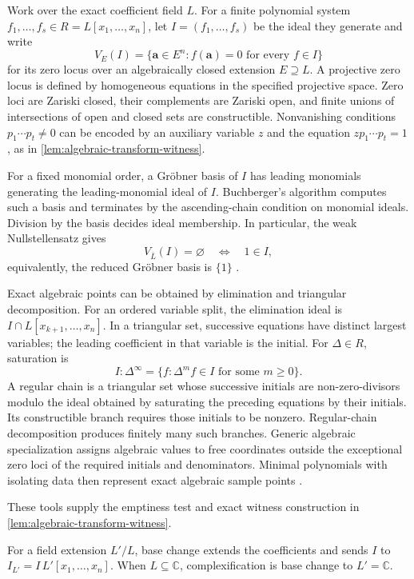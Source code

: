 \documentclass[11pt,letterpaper,onecolumn]{article}
\theoremstyle{plain}
\theoremstyle{definition}
\theoremstyle{remark}
\begin{document}
Work over the exact coefficient field \(L\). For a finite polynomial
system \(f_1,\ldots,f_s\in R=L[x_1,\ldots,x_n]\), let
\(I=(f_1,\ldots,f_s)\) be the ideal they generate and write
\[
 V_E(I)=\{\mathbf a\in E^n:f(\mathbf a)=0\text{ for every }f\in I\}
\]
for its zero locus over an algebraically closed extension \(E\supseteq L\).
A projective zero locus is defined by homogeneous equations in the
specified projective space. Zero loci are Zariski closed, their complements
are Zariski open, and finite unions of intersections of open and closed
sets are constructible. Nonvanishing conditions \(p_1\cdots p_t\ne0\)
can be encoded by an auxiliary variable \(z\) and the equation
\(z p_1\cdots p_t=1\), as in \cref{lem:algebraic-transform-witness}.

For a fixed monomial order, a Gr\"obner basis of \(I\) has leading
monomials generating the leading-monomial ideal of \(I\).
Buchberger's algorithm computes such a basis and terminates by the
ascending-chain condition on monomial ideals. Division by the basis
decides ideal membership. In particular, the weak Nullstellensatz gives
\[
 V_{\overline L}(I)=\varnothing\quad\Longleftrightarrow\quad1\in I,
\]
equivalently, the reduced Gr\"obner basis is \(\{1\}\)
\cite[Chapters~2--4]{CoxLittleOShea2015}.

Exact algebraic points can be obtained by elimination and triangular
decomposition. For an ordered variable split, the elimination ideal is
\(I\cap L[x_{k+1},\ldots,x_n]\). In a triangular set, successive equations
have distinct largest variables; the leading coefficient in that variable
is the initial. For \(\Delta\in R\), saturation is
\[
 I:\Delta^\infty=\{f:\Delta^m f\in I\text{ for some }m\ge0\}.
\]
A regular chain is a triangular set whose successive initials are
non-zero-divisors modulo the ideal obtained by saturating the preceding
equations by their initials. Its constructible branch requires those
initials to be nonzero. Regular-chain decomposition produces finitely
many such branches. Generic algebraic specialization assigns algebraic
values to free coordinates outside the exceptional zero loci of the
required initials and denominators. Minimal polynomials with isolating
data then represent exact algebraic sample points
\cite{AubryLazardMorenoMaza1999,Cohen1993}.

These tools supply the emptiness test and exact witness construction in
\cref{lem:algebraic-transform-witness}.

For a field extension \(L'/L\), base change extends the coefficients and
sends \(I\) to \(I_{L'}=I\,L'[x_1,\ldots,x_n]\).
When \(L\subseteq\mathbb C\), complexification is base change to
\(L'=\mathbb C\).
\end{document}
